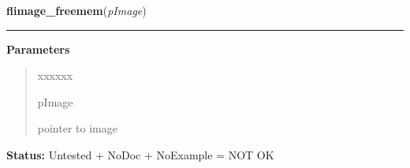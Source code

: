 \hspace{.8\funcindent}\begin{boxedminipage}{\funcwidth}

    \raggedright \textbf{flimage\_freemem}(\textit{pImage})

    \vspace{-1.5ex}

    \rule{\textwidth}{0.5\fboxrule}
\setlength{\parskip}{2ex}
\setlength{\parskip}{1ex}
      \textbf{Parameters}
      \vspace{-1ex}

      \begin{quote}
        \begin{Ventry}{xxxxxx}

          \item[pImage]

          pointer to image

        \end{Ventry}

      \end{quote}

\textbf{Status:} Untested + NoDoc + NoExample = NOT OK



    \end{boxedminipage}

    \label{xformslib:library:flimage_get_closest_color_from_map}

    \vspace{0.5ex}

